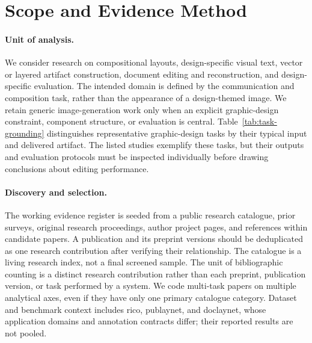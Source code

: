 \section{Scope and Evidence Method}
\label{sec:scope}
\paragraph{Unit of analysis.}
We consider research on compositional layouts, design-specific visual text, vector or layered artifact construction, document editing and reconstruction, and design-specific evaluation.
The intended domain is defined by the communication and composition task, rather than the appearance of a design-themed image.
We retain generic image-generation work only when an explicit graphic-design constraint, component structure, or evaluation is central.
Table~\ref{tab:task-grounding} distinguishes representative graphic-design tasks by their typical input and delivered artifact.
The listed studies exemplify these tasks, but their outputs and evaluation protocols must be inspected individually before drawing conclusions about editing performance.



\paragraph{Discovery and selection.}
The working evidence register is seeded from a public research catalogue, prior surveys, original research proceedings, author project pages, and references within candidate papers.
A publication and its preprint versions should be deduplicated as one research contribution after verifying their relationship.
The catalogue is a living research index, not a final screened sample.
The unit of bibliographic counting is a distinct research contribution rather than each preprint, publication version, or task performed by a system.
We code multi-task papers on multiple analytical axes, even if they have only one primary catalogue category.
Dataset and benchmark context includes \ac{rico}, \ac{publaynet}, and \ac{doclaynet}, whose application domains and annotation contracts differ; their reported results are not pooled.

